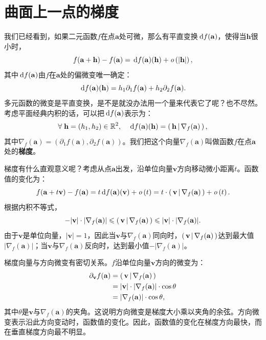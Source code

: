 \documentclass[12pt,UTF8]{ctexbook}
\begin{document}
\section{曲面上一点的梯度}
我们已经看到，如果二元函数$f$在点$\mathbf{a}$处可微，那么有平直变换$\,\mathrm{d} f(\mathbf{a})$，使得当$\mathbf{h}$很小时，
$$ f(\mathbf{a} + \mathbf{h}) - f(\mathbf{a}) = \,\mathrm{d} f(\mathbf{a})(\mathbf{h}) + \mathit{o}\left(|\mathbf{h}|\right), $$
其中$\,\mathrm{d} f(\mathbf{a})$由$f$在$\mathbf{a}$处的偏微变唯一确定：
$$ \,\mathrm{d} f(\mathbf{a})(\mathbf{h}) = h_1 \partial_1 f(\mathbf{a}) + h_2 \partial_2 f(\mathbf{a}). $$
多元函数的微变是平直变换，是不是就没办法用一个量来代表它了呢？也不尽然。考虑平面经典内积的话，可以把$\,\mathrm{d} f(\mathbf{a})$表示为：
$$ \forall\; \mathbf{h} = (h_1, h_2)\in \mathbb{R}^2, \quad \,\mathrm{d} f(\mathbf{a})(\mathbf{h}) = \displaystyle\left( \,\mathbf{h} \,\middle\vert \,\nabla_f(\mathbf{a}) \,\right), $$
其中$\nabla_f(\mathbf{a}) = (\partial_1 f(\mathbf{a}), \partial_2 f(\mathbf{a}))$。我们把这个向量$\nabla_f(\mathbf{a})$叫做函数$f$在点$\mathbf{a}$处的\textbf{梯度}。

梯度有什么直观意义呢？考虑从点$\mathbf{a}$出发，沿单位向量$\mathbf{v}$方向移动微小距离$t$。函数值的变化为：
$$ f(\mathbf{a} + t \mathbf{v}) - f(\mathbf{a}) = t \,\mathrm{d} f(\mathbf{a})(\mathbf{v}) + \mathit{o}\left(t\right) = t \cdot \displaystyle\left( \,\mathbf{v} \,\middle\vert \,\nabla_f(\mathbf{a}) \,\right)  + \mathit{o}\left(t\right). $$
根据内积不等式，
$$ -|\mathbf{v}|\cdot |\nabla_f(\mathbf{a})| \leqslant \displaystyle\left( \,\mathbf{v} \,\middle\vert \,\nabla_f(\mathbf{a}) \,\right) \leqslant |\mathbf{v}|\cdot |\nabla_f(\mathbf{a})|. $$
由于$\mathbf{v}$是单位向量，$|\mathbf{v}| = 1$，因此当$\mathbf{v}$与$\nabla_f(\mathbf{a})$同向时，$\displaystyle\left( \,\mathbf{v} \,\middle\vert \,\nabla_f(\mathbf{a}) \,\right)$达到最大值$|\nabla_f(\mathbf{a})|$；当$\mathbf{v}$与$\nabla_f(\mathbf{a})$反向时，达到最小值$-|\nabla_f(\mathbf{a})|$。

梯度向量与方向微变有密切关系。$f$沿单位向量$\mathbf{v}$方向的微变为：
\begin{align*}
\partial_{\mathbf{v}} f(\mathbf{a}) &= \displaystyle\left( \,\mathbf{v} \,\middle\vert \,\nabla_f(\mathbf{a}) \,\right) \\
&= |\mathbf{v}|\cdot |\nabla_f(\mathbf{a})| \cdot \cos\theta \\
&= |\nabla_f(\mathbf{a})| \cdot \cos\theta,
\end{align*}
其中$\theta$是$\mathbf{v}$与$\nabla_f(\mathbf{a})$的夹角。这说明方向微变是梯度大小乘以夹角的余弦。方向微变表示沿此方向变动时，函数值的变化。因此，函数值的变化在梯度方向最快，而在垂直梯度方向最不明显。
\end{document}
